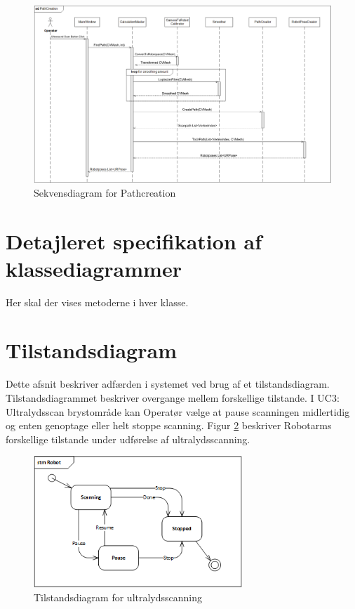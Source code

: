 \begin{figure}[H]
    \centering
    \includegraphics[width=1.2\textwidth, angle =90]{figurer/d/Design/Sequence/sd_ultrascan}
    \caption{Sekvensdiagram for Pathcreation}
    \label{sd_ultrascan}
\end{figure}

\section{Detajleret specifikation af klassediagrammer}
Her skal der vises metoderne i hver klasse. 

\section{Tilstandsdiagram}
Dette afsnit beskriver adfærden i systemet ved brug af et tilstandsdiagram. Tilstandsdiagrammet beskriver overgange mellem forskellige tilstande. I UC3: Ultralydsscan brystområde kan Operatør vælge at pause scanningen midlertidig og enten genoptage eller helt stoppe scanning. Figur \ref{stm_Ultra} beskriver Robotarms forskellige tilstande under udførelse af ultralydsscanning. 

\begin{figure}[H]
    \centering
    \includegraphics[width=0.7\textwidth]{figurer/d/Design/stm_UC3}
    \caption{Tilstandsdiagram for ultralydsscanning}
    \label{stm_Ultra}
\end{figure}

